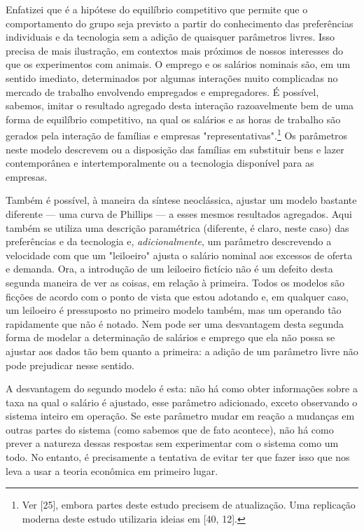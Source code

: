 \documentclass[12pt]{article}
\begin{document}
Enfatizei que é a hipótese do equilíbrio competitivo que permite que o comportamento do grupo seja previsto a partir do conhecimento das preferências individuais e da tecnologia sem a adição de quaisquer parâmetros livres. Isso precisa de mais ilustração, em contextos mais próximos de nossos interesses do que os experimentos com animais. O emprego e os salários nominais são, em um sentido imediato, determinados por algumas interações muito complicadas no mercado de trabalho envolvendo empregados e empregadores. É possível, sabemos, imitar o resultado agregado desta interação razoavelmente bem de uma forma de equilíbrio competitivo, na qual os salários e as horas de trabalho são gerados pela interação de famílias e empresas "representativas".\footnote{Ver [25], embora partes deste estudo precisem de atualização. Uma replicação moderna deste estudo utilizaria ideias em [40, 12].} Os parâmetros neste modelo descrevem ou a disposição das famílias em substituir bens e lazer contemporânea e intertemporalmente ou a tecnologia disponível para as empresas.

Também é possível, à maneira da síntese neoclássica, ajustar um modelo bastante diferente — uma curva de Phillips — a esses mesmos resultados agregados. Aqui também se utiliza uma descrição paramétrica (diferente, é claro, neste caso) das preferências e da tecnologia e, \textit{adicionalmente}, um parâmetro descrevendo a velocidade com que um "leiloeiro" ajusta o salário nominal aos excessos de oferta e demanda. Ora, a introdução de um leiloeiro fictício não é um defeito desta segunda maneira de ver as coisas, em relação à primeira. Todos os modelos são ficções de acordo com o ponto de vista que estou adotando e, em qualquer caso, um leiloeiro é pressuposto no primeiro modelo também, mas um operando tão rapidamente que não é notado. Nem pode ser uma desvantagem desta segunda forma de modelar a determinação de salários e emprego que ela não possa se ajustar aos dados tão bem quanto a primeira: a adição de um parâmetro livre não pode prejudicar nesse sentido.

A desvantagem do segundo modelo é esta: não há como obter informações sobre a taxa na qual o salário é ajustado, esse parâmetro adicionado, exceto observando o sistema inteiro em operação. Se este parâmetro mudar em reação a mudanças em outras partes do sistema (como sabemos que de fato acontece), não há como prever a natureza dessas respostas sem experimentar com o sistema como um todo. No entanto, é precisamente a tentativa de evitar ter que fazer isso que nos leva a usar a teoria econômica em primeiro lugar.
\end{document}
